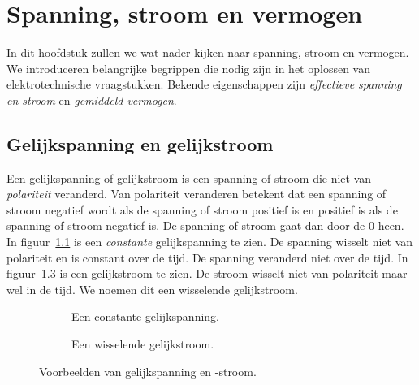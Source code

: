 \chapter{Spanning, stroom en vermogen}
In dit hoofdstuk zullen we wat nader kijken naar spanning, stroom en vermogen. We introduceren belangrijke begrippen die nodig zijn in het oplossen van elektrotechnische vraagstukken. Bekende eigenschappen zijn \textsl{effectieve spanning en stroom} en \textsl{gemiddeld vermogen}.

\section{Gelijkspanning en gelijkstroom}
Een gelijkspanning of gelijkstroom is een spanning of stroom die niet van \textsl{polariteit} veranderd. Van polariteit veranderen betekent dat een spanning of stroom negatief wordt als de spanning of stroom positief is en positief is als de spanning of stroom negatief is. De spanning of stroom gaat dan door de 0 heen. In figuur~\ref{fig:spaconstgelijkspanning} is een \textsl{constante} gelijkspanning te zien. De spanning wisselt niet van polariteit en is constant over de tijd. De spanning veranderd niet over de tijd. In figuur~\ref{fig:spawisgelijkspanning} is een gelijkstroom te zien. De stroom wisselt niet van polariteit maar wel in de tijd. We noemen dit een wisselende gelijkstroom.

\begin{figure}[!ht]
\centering
\begin{subfigure}[b]{0.48\textwidth}
\centering
{}
\caption{Een constante gelijkspanning.}
\label{fig:spaconstgelijkspanning}
\end{subfigure}
\begin{subfigure}[b]{0.48\textwidth}
\centering
{}
\caption{Een wisselende gelijkstroom.}
\label{fig:spawisgelijkspanning}
\end{subfigure}
\caption{Voorbeelden van gelijkspanning en -stroom.}
\end{figure}


